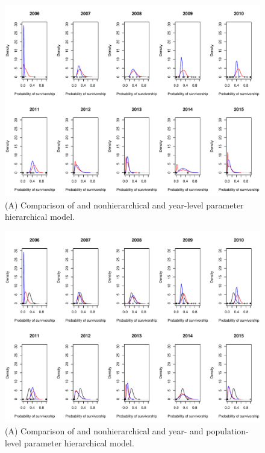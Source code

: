 \documentclass[12pt, oneside, titlepage]{article}   	%
\begin{document}
 \begin{figure}[h]
   \centering
       \includegraphics[page=1,width=.9\textwidth]{../figures/appendix-x-hierarchyPosteriors_nh_hyear}  
    \caption{ (A) Comparison of and nonhierarchical and year-level parameter hierarchical model. }
 \label{fig:hierarchyPosteriors_nh_hyear}
\end{figure}

\begin{figure}[h]
   \centering
       \includegraphics[page=1,width=.9\textwidth]{../figures/appendix-x-hierarchyPosteriors_nh_hyearpop}  
    \caption{ (A) Comparison of and nonhierarchical and year- and population-level parameter hierarchical model.  }
 \label{fig:hierarchyPosteriors_nh_hyearpop}
\end{figure}
\end{document}
